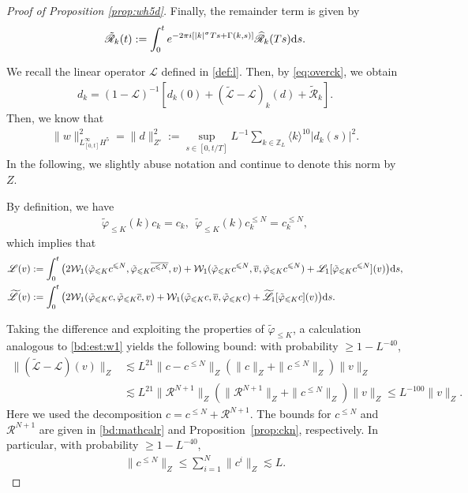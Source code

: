 \documentclass[UTF-8,reqno]{amsart}
\numberwithin{equation}{section}
\theoremstyle{definition}
\def\dif{{\mathord{{\rm d}}}}
\def\geq{\geqslant}
\def\leq{\leqslant}
\def\dif{{\mathord{{\rm d}}}}
\def\geq{\geqslant}
\def\leq{\leqslant}
\begin{document}
\begin{proof}[Proof of Proposition \ref{prop:wh5d}]
Finally, the remainder term is given by 
\begin{align*}
  \tilde{\mathscr{R}}_k(t):=\int_0^t e^{-2\pi i[|k|^\sigma Ts+\Gamma(k,s)]}  \widehat{\mathscr{R}}_k(Ts)\dif s.
\end{align*}


We recall the linear operator $\mathscr{L}$ defined in \eqref{def:l}.  
Then, by \eqref{eq:overck}, we obtain  
\begin{align}
 d_k=(1-\mathscr{L})   ^{-1}[d_k(0)+(\widetilde{\mathscr{L}}-\mathscr{L})_k( d)+\tilde{\mathscr{R}}_k].\label{eq:dk}
\end{align}
Then, we know that 
\begin{align*}
  \|w\|_{L_{[0,t]}^\infty H^5}^2=  \|d\|_{Z'}^2:=\sup_{s\in[0,t/T]}L^{-1}\sum_{k \in \mathbb{Z}_L}\langle k\rangle^{10}|d_k(s)|^2.
\end{align*}
In the following, we slightly abuse notation and continue to denote this norm by $Z$.

By definition, we have
\begin{align*}
    \tilde\varphi_{\leq K}(k)c_k=c_k,\ \  \tilde\varphi_{\leq K}(k)c^{\leq N}_k=c^{\leq N}_k, 
\end{align*}
which implies that 
\begin{align*}
    \mathscr{L}(v)&:=\int_0^t \big(2\mathcal{W}_1( \tilde\varphi_{\leq K}c^{\leq N},  \tilde\varphi_{\leq K}\overline{c^{\leq N}}, v)+\mathcal{W}_1( \tilde\varphi_{\leq K}c^{\leq N},\overline{ v},  \tilde\varphi_{\leq K}c^{\leq N})+\mathscr{L}_1[ \tilde\varphi_{\leq K}c^{\leq N}](v)\big)\dif s,  \\
\widetilde{\mathscr{L}}(v)&:=\int_0^t \big(2\mathcal{W}_1(\tilde\varphi_{\leq K} c,\tilde\varphi_{\leq K}\overline c, v)+\mathcal{W}_1(\tilde\varphi_{\leq K}c, \overline v, \tilde\varphi_{\leq K}c)+\widetilde{\mathscr{L}_1}[\tilde\varphi_{\leq K}c](v)\big)\dif s. 
\end{align*}

Taking the difference and exploiting the properties of $\tilde{\varphi}_{\leq K}$, a calculation analogous to \eqref{bd:est:w1} yields the following bound: with probability $\geq 1 - L^{-40}$,
\begin{align*}
   \| (\widetilde{\mathscr{L}}-\mathscr{L})(v)\|_{Z}
  & \lesssim  L^{21} \|c -c^{\leq N}\|_{Z}( \|c \|_Z+ \|c^{\leq N}\|_Z)\|v\|_{Z}\\
   &\lesssim L^{21} \|\mathcal{R}^{N+1}\|_{Z}( \|\mathcal{R}^{N+1}\|_{Z}+ \|c^{\leq N}\|_{Z})\|v\|_{Z}\leq L^{-100}\|v\|_{Z}.
\end{align*}
Here we used the decomposition $c=c^{\leq N}+\mathcal{R}^{N+1}$.  The bounds for $c^{\leq N}$ and $\mathcal{R}^{N+1}$ are given in \eqref{bd:mathcalr} and Proposition~\ref{prop:ckn}, respectively. In particular, with probability $\geq 1-L^{-40}$,
\begin{align}
    \|c^{\leq N} \|_{Z}\leq \sum_{i=1}^N\|c^{i} \|_{Z}\lesssim L.\label{bd:cz}
\end{align}


\end{proof}
\end{document}
